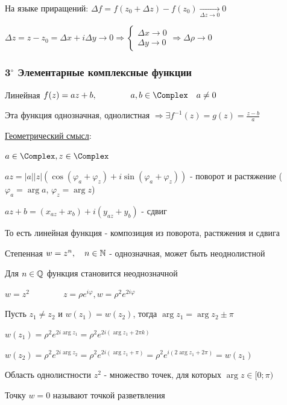 \documentclass[12pt]{article}
\begin{document}
На языке приращений: $\Delta f = f(z_0 + \Delta z) - f(z_0) \underset{\Delta z \to 0}{\longrightarrow} 0$

$\Delta z = z - z_0 = \Delta x + i \Delta y \to 0 \Longrightarrow 
\begin{cases}\Delta x \to 0 \\ \Delta y \to 0\end{cases} \Longrightarrow 
\Delta \rho \to 0$

\subsubsection{3$^\circ$ Элементарные комплексные функции}

 Линейная $f(z) = az + b, \qquad\qquad a, b \in \Complex \quad a \neq 0$

Эта функция однозначная, однолистная $\Longrightarrow \exists f^{-1}(z) = g(z) = \frac{z - b}{a}$

\underline{Геометрический смысл}:

$a \in \Complex, z \in \Complex$

$az = |a| |z| (\cos (\varphi_a + \varphi_z) + i \sin (\varphi_a + \varphi_z))$ - поворот и растяжение 
($\varphi_a = \arg a$, $\varphi_z = \arg z$)

$az + b = (x_{az} + x_b) + i (y_{az} + y_b)$ - сдвиг

То есть линейная функция - композиция из поворота, растяжения и сдвига

 Степенная $w = z^n, \quad n \in \mathbb{N}$ - однозначная, может быть неоднолистной

Для $n \in \mathbb{Q}$ функция становится неоднозначной

\Exs $w = z^2 \qquad\qquad z = \rho e^{i\varphi}, w = \rho^2 e^{2i\varphi}$

Пусть $z_1 \neq z_2$ и $w(z_1) = w(z_2)$, тогда $\arg z_1 = \arg z_2 \pm \pi$ 

$w(z_1) = \rho^2 e^{2i\arg z_1} = \rho^2 e^{2i (\arg z_1 + 2\pi k)}$

$w(z_2) = \rho^2 e^{2i\arg z_2} = \rho^2 e^{2i (\arg z_1 + \pi)} = \rho^2 e^{i (2\arg z_1 + 2\pi)} = w(z_1)$

Область однолистности $z^2$ - множество точек, для которых $\arg z \in [0; \pi)$

Точку $w = 0$ называют точкой разветвления

\end{document}
